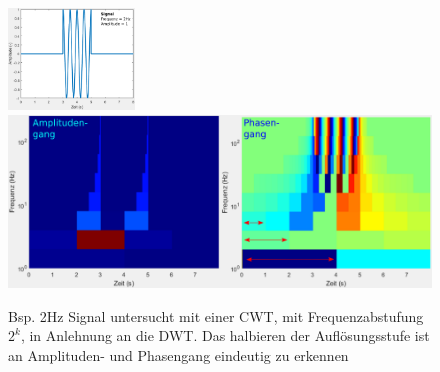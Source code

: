 \begin{figure}
	\centering
	\includegraphics[width=0.3\textwidth]{papers/wavelets/images/17-3_AnwCwtFilterbankSig.png}
	\includegraphics[width=\textwidth]{papers/wavelets/images/17-3_CWT-FilterbankStyle.png}
	\caption{Bsp. 2Hz Signal untersucht mit einer CWT, mit Frequenzabstufung $2^k$, in Anlehnung an die DWT. Das halbieren der Auflösungsstufe ist an Amplituden- und Phasengang eindeutig zu erkennen}
	\label{wavelet:fig:FilterbankAnwendung}
\end{figure}

